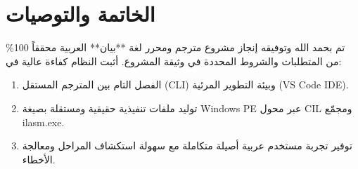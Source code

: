 \documentclass[12pt,a4paper]{report}
\begin{document}
\chapter{الخاتمة والتوصيات}
تم بحمد الله وتوفيقه إنجاز مشروع مترجم ومحرر لغة **بيان** العربية محققاً 100\% من المتطلبات والشروط المحددة في وثيقة المشروع. أثبت النظام كفاءة عالية في:
\begin{enumerate}
    \item الفصل التام بين المترجم المستقل (CLI) وبيئة التطوير المرئية (VS Code IDE).
    \item توليد ملفات تنفيذية حقيقية ومستقلة بصيغة Windows PE عبر محول CIL ومجمّع ilasm.exe.
    \item توفير تجربة مستخدم عربية أصيلة متكاملة مع سهولة استكشاف المراحل ومعالجة الأخطاء.
\end{enumerate}
\end{document}
